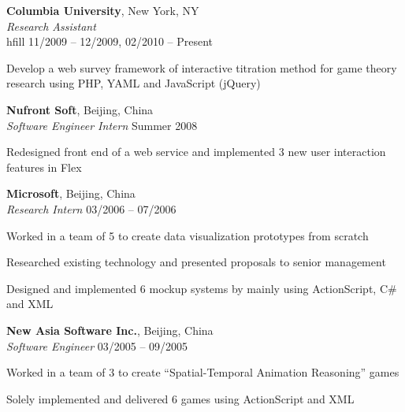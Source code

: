 \documentclass[margin,line]{resume}
\begin{document}
\begin{resume}
    \textbf{Columbia University}, New York, NY \\
    \textsl{Research Assistant} \\hfill 11/2009 -- 12/2009, 02/2010 -- Present \vspace{-3mm}\\\vspace{-1mm}%
      \begin{list2} 
      \item Develop a web survey framework of interactive titration method for game theory research using PHP, YAML and JavaScript (jQuery)
      \end{list2}

    \textbf{Nufront Soft}, Beijing, China \\
    \textsl{Software Engineer Intern} \hfill Summer 2008 \vspace{-3mm}\\\vspace{-1mm}%
      \begin{list2}
      \item Redesigned front end of a web service and implemented 3 new user interaction features in Flex 
      \end{list2}

    \textbf{Microsoft}, Beijing, China \\
    \textsl{Research Intern} \hfill 03/2006 -- 07/2006 \vspace{-3mm}\\\vspace{-1mm}%
      \begin{list2}
      \item Worked in a team of 5 to create data visualization prototypes from scratch 
      \item Researched existing technology and presented proposals to senior management 
      \item Designed and implemented 6 mockup systems by mainly using ActionScript, C\# and XML 
      \end{list2}
   
    \textbf{New Asia Software Inc.}, Beijing, China \\
    \textsl{Software Engineer} \hfill 03/2005 -- 09/2005  \vspace{-3mm}\\\vspace{-1mm}%
     \begin{list2}
      \item Worked in a team of 3 to create “Spatial-Temporal Animation Reasoning” games
      \item Solely implemented and delivered 6 games using ActionScript and XML      
     \end{list2}



\end{resume}
\end{document}
